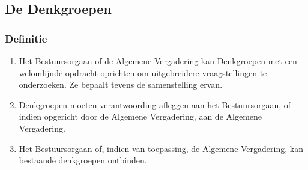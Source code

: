 \subsection{De Denkgroepen}

    \subsubsection{Definitie}
    \begin{enumerate}
    \item Het Bestuursorgaan of de Algemene Vergadering kan Denkgroepen met een welomlijnde opdracht oprichten om uitgebreidere vraagstellingen te onderzoeken. Ze bepaalt tevens de samenstelling ervan.
    \item Denkgroepen moeten verantwoording afleggen aan het Bestuursorgaan, of indien opgericht door de Algemene Vergadering, aan de Algemene Vergadering. 
    \item Het Bestuursorgaan of, indien van toepassing, de Algemene Vergadering, kan bestaande denkgroepen ontbinden.
    \end{enumerate}




